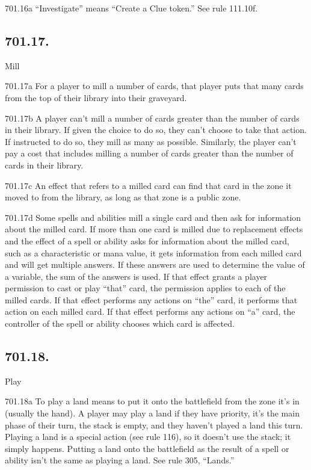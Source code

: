 701.16a “Investigate” means “Create a Clue token.” See rule 111.10f.

\subsection*{701.17.}
Mill

701.17a For a player to mill a number of cards, that player puts that many cards from the top of their library into their graveyard.

701.17b A player can’t mill a number of cards greater than the number of cards in their library. If given the choice to do so, they can’t choose to take that action. If instructed to do so, they mill as many as possible. Similarly, the player can’t pay a cost that includes milling a number of cards greater than the number of cards in their library.

701.17c An effect that refers to a milled card can find that card in the zone it moved to from the library, as long as that zone is a public zone.

701.17d Some spells and abilities mill a single card and then ask for information about the milled card. If more than one card is milled due to replacement effects and the effect of a spell or ability asks for information about the milled card, such as a characteristic or mana value, it gets information from each milled card and will get multiple answers. If these answers are used to determine the value of a variable, the sum of the answers is used. If that effect grants a player permission to cast or play “that” card, the permission applies to each of the milled cards. If that effect performs any actions on “the” card, it performs that action on each milled card. If that effect performs any actions on “a” card, the controller of the spell or ability chooses which card is affected.

\subsection*{701.18.}
Play

701.18a To play a land means to put it onto the battlefield from the zone it’s in (usually the hand). A player may play a land if they have priority, it’s the main phase of their turn, the stack is empty, and they haven’t played a land this turn. Playing a land is a special action (see rule 116), so it doesn’t use the stack; it simply happens. Putting a land onto the battlefield as the result of a spell or ability isn’t the same as playing a land. See rule 305, “Lands.”

